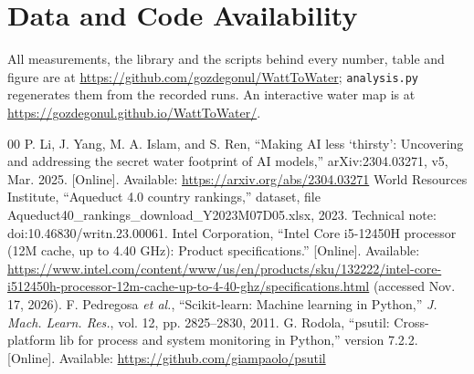 \documentclass[conference]{IEEEtran}
\begin{document}
\section*{Data and Code Availability}

All measurements, the library and the scripts behind every number, table and figure are at \url{https://github.com/gozdegonul/WattToWater}; \texttt{analysis.py} regenerates them from the recorded runs. An interactive water map is at \url{https://gozdegonul.github.io/WattToWater/}.

\begin{thebibliography}{00}
 P. Li, J. Yang, M. A. Islam, and S. Ren, ``Making AI less `thirsty': Uncovering and addressing the secret water footprint of AI models,'' arXiv:2304.03271, v5, Mar. 2025. [Online]. Available: \url{https://arxiv.org/abs/2304.03271}
 World Resources Institute, ``Aqueduct 4.0 country rankings,'' dataset, file Aqueduct40\_rankings\_download\_Y2023M07D05.xlsx, 2023. Technical note: doi:10.46830/writn.23.00061.
 Intel Corporation, ``Intel Core i5-12450H processor (12M cache, up to 4.40 GHz): Product specifications.'' [Online]. Available: \url{https://www.intel.com/content/www/us/en/products/sku/132222/intel-core-i512450h-processor-12m-cache-up-to-4-40-ghz/specifications.html} (accessed Nov. 17, 2026).
 F. Pedregosa \textit{et al.}, ``Scikit-learn: Machine learning in Python,'' \textit{J. Mach. Learn. Res.}, vol. 12, pp. 2825--2830, 2011.
 G. Rodola, ``psutil: Cross-platform lib for process and system monitoring in Python,'' version 7.2.2. [Online]. Available: \url{https://github.com/giampaolo/psutil}
\end{thebibliography}
\end{document}
